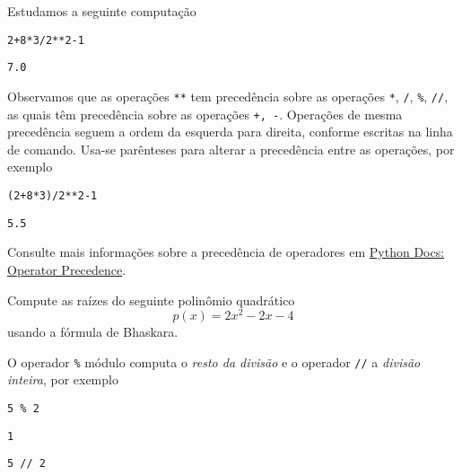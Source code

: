 \documentclass[12pt]{article}
\begin{document}
\begin{ex}
  Estudamos a seguinte computação

\begin{lstlisting}
2+8*3/2**2-1
\end{lstlisting}

\begin{verbatim}
7.0
\end{verbatim}

Observamos que as operações \lstinline+**+ tem precedência sobre as operações \lstinline+*+, \lstinline+/+, \texttt{\%}, \lstinline+//+, as quais têm precedência sobre as operações \lstinline!+, -!. Operações de mesma precedência seguem a ordem da esquerda para direita, conforme escritas na linha de comando. Usa-se parênteses para alterar a precedência entre as operações, por exemplo

\begin{lstlisting}
(2+8*3)/2**2-1
\end{lstlisting}

\begin{verbatim}
5.5
\end{verbatim}

\end{ex}

\begin{obs}
Consulte mais informações sobre a precedência de operadores em \href{https://docs.python.org/3/reference/expressions.html#operator-precedence}{Python Docs: Operator Precedence}.
\end{obs}

\begin{exr}\label{exr:bhaskara}
  Compute as raízes do seguinte polinômio quadrático
  \begin{equation}
    p(x) = 2x^2 - 2x - 4
  \end{equation}
  usando a fórmula de Bhaskara{\bhaskara}.
\end{exr}

O operador \texttt{\%} módulo computa o \emph{resto da divisão} e o operador \lstinline+//+ a \emph{divisão inteira}, por exemplo

\begin{lstlisting}
5 % 2
\end{lstlisting}

\begin{verbatim}
1
\end{verbatim}

\begin{lstlisting}
5 // 2
\end{lstlisting}
\end{document}

